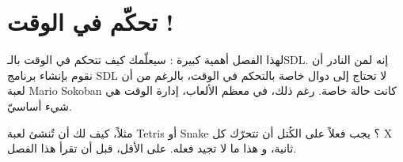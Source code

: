 \chapter{تحكّم في الوقت !}

لهذا الفصل أهمية كبيرة : سيعلّمك كيف تتحكم في الوقت بالـ\textenglish{SDL}.
 إنه لمن النادر أن نقوم بإنشاء برنامج
\textenglish{SDL}
لا تحتاج إلى دوال خاصة بالتحكم في الوقت، بالرغم من أن لعبة
\textenglish{Mario Sokoban}
كانت حالة خاصة. رغم ذلك، في معظم الألعاب، إدارة الوقت هي شيء أساسيّ.

مثلاً، كيف لك أن تٌنشئ لعبة 
\textenglish{Tetris}
أو
\textenglish{Snake} ؟
يجب فعلاً على الكُتل أن تتحرّك كل
\textenglish{X}
ثانية، و هذا ما لا تجيد فعله. على الأقل، قبل أن تقرأ هذا الفصل.
